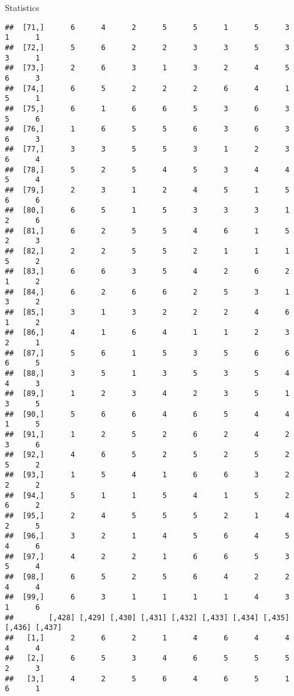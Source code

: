\documentclass[
  ignorenonframetext,
]{beamer}
\begin{document}
\begin{frame}[fragile]{Statistics}
\begin{verbatim}
##  [71,]      6      4      2      5      5      1      5      3      1      1
##  [72,]      5      6      2      2      3      3      5      3      3      1
##  [73,]      2      6      3      1      3      2      4      5      6      3
##  [74,]      6      5      2      2      2      6      4      1      5      1
##  [75,]      6      1      6      6      5      3      6      3      5      6
##  [76,]      1      6      5      5      6      3      6      3      6      3
##  [77,]      3      3      5      5      3      1      2      3      6      4
##  [78,]      5      2      5      4      5      3      4      4      5      4
##  [79,]      2      3      1      2      4      5      1      5      6      6
##  [80,]      6      5      1      5      3      3      3      1      2      6
##  [81,]      6      2      5      5      4      6      1      5      2      3
##  [82,]      2      2      5      5      2      1      1      1      5      2
##  [83,]      6      6      3      5      4      2      6      2      1      2
##  [84,]      6      2      6      6      2      5      3      1      3      2
##  [85,]      3      1      3      2      2      2      4      6      1      2
##  [86,]      4      1      6      4      1      1      2      3      2      1
##  [87,]      5      6      1      5      3      5      6      6      6      5
##  [88,]      3      5      1      3      5      3      5      4      4      3
##  [89,]      1      2      3      4      2      3      5      1      3      5
##  [90,]      5      6      6      4      6      5      4      4      1      5
##  [91,]      1      2      5      2      6      2      4      2      3      6
##  [92,]      4      6      5      2      5      2      5      2      5      2
##  [93,]      1      5      4      1      6      6      3      2      2      2
##  [94,]      5      1      1      5      4      1      5      2      6      2
##  [95,]      2      4      5      5      5      2      1      4      2      5
##  [96,]      3      2      1      4      5      6      4      5      4      6
##  [97,]      4      2      2      1      6      6      5      3      5      4
##  [98,]      6      5      2      5      6      4      2      2      4      4
##  [99,]      6      3      1      1      1      1      4      3      1      6
##        [,428] [,429] [,430] [,431] [,432] [,433] [,434] [,435] [,436] [,437]
##   [1,]      2      6      2      1      4      6      4      4      4      4
##   [2,]      6      5      3      4      6      5      5      5      2      3
##   [3,]      4      2      5      6      4      6      5      1      6      1

\end{verbatim}
\end{frame}
\end{document}
